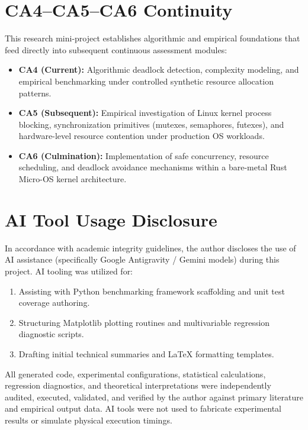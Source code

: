 \documentclass[11pt,a4paper]{article}
\begin{document}
\section{CA4--CA5--CA6 Continuity}
This research mini-project establishes algorithmic and empirical foundations that feed directly into subsequent continuous assessment modules:
\begin{itemize}
    \item \textbf{CA4 (Current):} Algorithmic deadlock detection, complexity modeling, and empirical benchmarking under controlled synthetic resource allocation patterns.
    \item \textbf{CA5 (Subsequent):} Empirical investigation of Linux kernel process blocking, synchronization primitives (mutexes, semaphores, futexes), and hardware-level resource contention under production OS workloads.
    \item \textbf{CA6 (Culmination):} Implementation of safe concurrency, resource scheduling, and deadlock avoidance mechanisms within a bare-metal Rust Micro-OS kernel architecture.
\end{itemize}

\section{AI Tool Usage Disclosure}
In accordance with academic integrity guidelines, the author discloses the use of AI assistance (specifically Google Antigravity / Gemini models) during this project. AI tooling was utilized for:
\begin{enumerate}
    \item Assisting with Python benchmarking framework scaffolding and unit test coverage authoring.
    \item Structuring Matplotlib plotting routines and multivariable regression diagnostic scripts.
    \item Drafting initial technical summaries and LaTeX formatting templates.
\end{enumerate}
All generated code, experimental configurations, statistical calculations, regression diagnostics, and theoretical interpretations were independently audited, executed, validated, and verified by the author against primary literature and empirical output data. AI tools were not used to fabricate experimental results or simulate physical execution timings.
\end{document}
